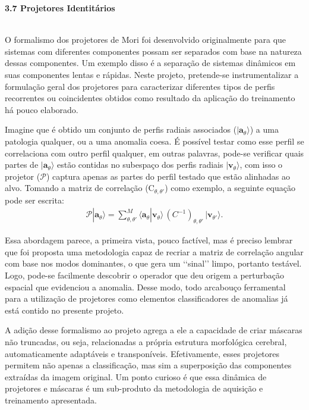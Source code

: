 \documentclass[a4paper, 12pt]{report}
\begin{document}
$\frac{}{}$\\
\begin{Large}
	\textbf{3.7 Projetores Identitários}
\end{Large}
$\frac{}{}$\\

O formalismo dos projetores de Mori \cite{Mori1965} foi desenvolvido originalmente para que sistemas com diferentes componentes possam ser separados com base na natureza dessas componentes. Um exemplo disso é a separação de sistemas dinâmicos em suas componentes lentas e rápidas. Neste projeto, pretende-se instrumentalizar a formulação geral dos projetores para caracterizar diferentes tipos de perfis recorrentes ou coincidentes obtidos como resultado da aplicação do treinamento há pouco elaborado.

Imagine que é obtido um conjunto de perfis radiais associados ($| \mathbf{a}_{\theta} \rangle$) a uma patologia qualquer, ou a uma anomalia coesa. É possível testar como esse perfil se correlaciona com outro perfil qualquer, em outras palavras, pode-se verificar quais partes de $| \mathbf{a}_{\theta} \rangle$ estão contidas no subespaço dos perfis radiais $| \mathbf{v}_{\theta} \rangle$, com isso o projetor ($\mathcal{P}$) captura apenas as partes do perfil testado que estão alinhadas ao alvo. Tomando a matriz de correlação ($\text{C}_{\theta,\theta'}$) como exemplo, a seguinte equação pode ser escrita:
\begin{align}
	\mathcal{P} | \mathbf{a}_{\theta} \rangle = \sum_{\theta,\theta'}^{M} \langle \mathbf{a}_{\theta} | \mathbf{v}_\theta \rangle \, (C^{-1})_{\theta,\theta'} \, | \mathbf{v}_{\theta'} \rangle.
	\label{eq:Mori}
\end{align}

Essa abordagem parece, a primeira vista, pouco factível, mas é preciso lembrar que foi proposta uma metodologia capaz de recriar a matriz de correlação angular com base nos modos dominantes, o que gera um {\lq\lq}sinal{\rq\rq} limpo, portanto testável. Logo, pode-se facilmente descobrir o operador que deu origem a perturbação espacial que evidenciou a anomalia. Desse modo, todo arcabouço ferramental para a utilização de projetores como elementos classificadores de anomalias já está contido no presente projeto. 

A adição desse formalismo ao projeto agrega a ele a capacidade de criar máscaras não truncadas, ou seja, relacionadas a própria estrutura morfológica cerebral, automaticamente adaptáveis e transponíveis. Efetivamente, esses projetores permitem não apenas a classificação, mas sim a superposição das componentes extraídas da imagem original. Um ponto curioso é que essa dinâmica de projetores e máscaras é um sub-produto da metodologia de aquisição e treinamento apresentada. 
\end{document}
